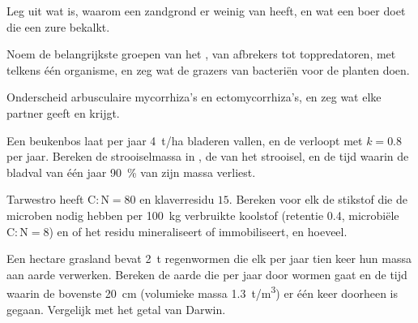 \begin{exercise}[$\star$]\label{exo:b2:living-soil:2}
Leg uit wat  is, waarom een zandgrond er weinig
van heeft, en wat een boer doet die een zure  bekalkt.
\end{exercise}

\begin{exercise}[$\star$]\label{exo:b2:living-soil:3}
Noem de belangrijkste groepen van het , van afbrekers tot
toppredatoren, met telkens één organisme, en zeg wat de grazers van
bacteriën voor de planten doen.
\end{exercise}

\begin{exercise}[$\star$]\label{exo:b2:living-soil:4}
Onderscheid arbusculaire mycorrhiza's en ectomycorrhiza's, en zeg wat elke
partner geeft en krijgt.
\end{exercise}

\begin{exercise}[$\star\star$]\label{exo:b2:living-soil:5}
Een beukenbos laat per jaar \qty{4}{t/ha} bladeren vallen, en de
 verloopt met $k = 0.8$ per jaar. Bereken de strooiselmassa in , de  van het strooisel, en de tijd waarin de bladval van
één jaar \qty{90}{\%} van zijn massa verliest.
\end{exercise}

\begin{exercise}[$\star\star$]\label{exo:b2:living-soil:6}
Tarwestro heeft $\mathrm{C:N} = 80$ en klaverresidu $15$. Bereken voor
elk de stikstof die de microben nodig hebben per \qty{100}{kg}
verbruikte koolstof (retentie 0.4, microbiële $\mathrm{C:N} = 8$) en
of het residu mineraliseert of immobiliseert, en hoeveel.
\end{exercise}

\begin{exercise}[$\star\star$]\label{exo:b2:living-soil:7}
Een hectare grasland bevat \qty{2}{t} regenwormen die elk per jaar tien keer
hun massa aan aarde verwerken. Bereken de aarde die per jaar door wormen gaat
en de tijd waarin de bovenste \qty{20}{cm} (volumieke massa
\qty{1.3}{t/m^3}) er één keer doorheen is gegaan. Vergelijk met het getal van
Darwin.
\end{exercise}

